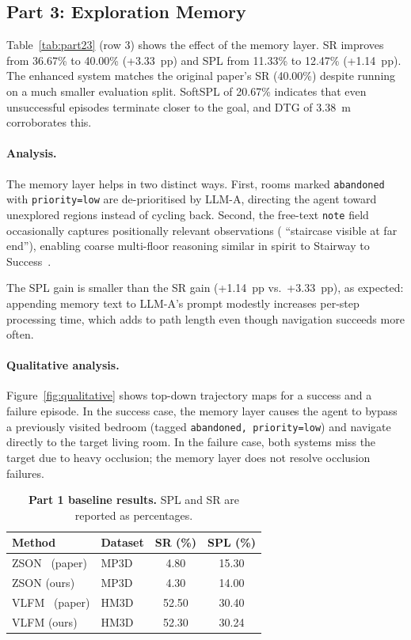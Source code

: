 \documentclass[10pt,twocolumn,letterpaper]{article}
\begin{document}
\subsection{Part 3: Exploration Memory}

Table~\ref{tab:part23} (row 3) shows the effect of the memory layer.
SR improves from 36.67\% to 40.00\% (+3.33~pp) and SPL from 11.33\% to
12.47\% (+1.14~pp).
The enhanced system matches the original paper's SR (40.00\%) despite
running on a much smaller evaluation split.
SoftSPL of 20.67\% indicates that even unsuccessful episodes terminate
closer to the goal, and DTG of 3.38~m corroborates this.

\paragraph{Analysis.}
The memory layer helps in two distinct ways.
First, rooms marked \texttt{abandoned} with \texttt{priority=low} are
de-prioritised by LLM-A, directing the agent toward unexplored regions
instead of cycling back.
Second, the free-text \texttt{note} field occasionally captures
positionally relevant observations (\eg{} ``staircase visible at far end''),
enabling coarse multi-floor reasoning similar in spirit to Stairway to
Success~\cite{stairway2024}.

The SPL gain is smaller than the SR gain (+1.14~pp vs.\ +3.33~pp), as
expected: appending memory text to LLM-A's prompt modestly increases
per-step processing time, which adds to path length even though navigation
succeeds more often.

\paragraph{Qualitative analysis.}
Figure~\ref{fig:qualitative} shows top-down trajectory maps for a
success and a failure episode.
In the success case, the memory layer causes the agent to bypass a
previously visited bedroom (tagged \texttt{abandoned, priority=low}) and
navigate directly to the target living room.
In the failure case, both systems miss the target due to heavy occlusion;
the memory layer does not resolve occlusion failures.

\begin{table}[t]
\centering
\caption{
  \textbf{Part 1 baseline results.}
  SPL and SR are reported as percentages.
}
\label{tab:part1}
\setlength{\tabcolsep}{5pt}
\begin{tabular}{llcc}
\toprule
Method & Dataset & SR (\%) & SPL (\%) \\
\midrule
ZSON~\cite{majumdar2022zson} (paper) & MP3D & 4.80  & 15.30 \\
ZSON (ours)                          & MP3D & 4.30  & 14.00 \\
\midrule
VLFM~\cite{yokoyama2024vlfm} (paper) & HM3D & 52.50 & 30.40 \\
VLFM (ours)                          & HM3D & 52.30 & 30.24 \\
\bottomrule
\end{tabular}
\end{table}
\end{document}
